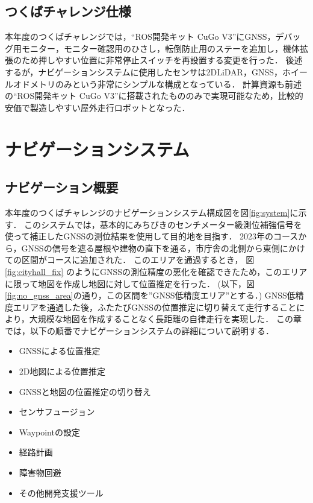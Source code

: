 \documentclass[platex,dvipdfmx]{rbproceedings}
\begin{document}
\subsection{つくばチャレンジ仕様}
本年度のつくばチャレンジでは，“ROS開発キット CuGo V3”にGNSS，デバッグ用モニター，モニター確認用のひさし，転倒防止用のステーを追加し，機体拡張のため押しやすい位置に非常停止スイッチを再設置する変更を行った．
後述するが，ナビゲーションシステムに使用したセンサは2DLiDAR，GNSS，ホイールオドメトリのみという非常にシンプルな構成となっている．
計算資源も前述の“ROS開発キット CuGo V3”に搭載されたもののみで実現可能なため，比較的安価で製造しやすい屋外走行ロボットとなった．

\section{ナビゲーションシステム}
\subsection{ナビゲーション概要}
本年度のつくばチャレンジのナビゲーションシステム構成図を図\ref{fig:system}に示す．
このシステムでは，基本的にみちびきのセンチメーター級測位補強信号を使って補正したGNSSの測位結果を使用して目的地を目指す．
2023年のコースから，GNSSの信号を遮る屋根や建物の直下を通る，市庁舎の北側から東側にかけての区間がコースに追加された．
このエリアを通過するとき， 図\ref{fig:cityhall_fix} のようにGNSSの測位精度の悪化を確認できたため，このエリアに限って地図を作成し地図に対して位置推定を行った．
(以下，図\ref{fig:no_gnss_area}の通り，この区間を”GNSS低精度エリア”とする．)
GNSS低精度エリアを通過した後，ふたたびGNSSの位置推定に切り替えて走行することにより，大規模な地図を作成することなく長距離の自律走行を実現した．
この章では，以下の順番でナビゲーションシステムの詳細について説明する．

\begin{itemize}
    \item GNSSによる位置推定
    \item 2D地図による位置推定
    \item GNSSと地図の位置推定の切り替え
    \item センサフュージョン
    \item Waypointの設定
    \item 経路計画
    \item 障害物回避
    \item その他開発支援ツール
\end{itemize}
\end{document}
